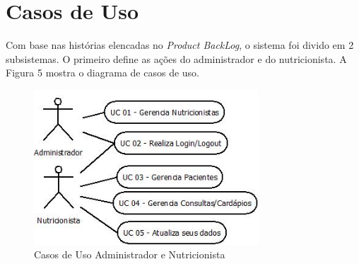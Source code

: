 \documentclass[
	12pt,				%
    oneside,			%
	a4paper,			%
	english,			%
	french,				%
	spanish,			%
	brazil,				%
	]{abntex2}
\begin{document}
\section{Casos de Uso}

Com base nas histórias elencadas no \textit{Product BackLog}, o sistema foi divido em 2
subsistemas. O primeiro define as ações do administrador e do nutricionista. A Figura 5
mostra o diagrama de casos de uso.

\begin{figure} [hbt] 
\label{table1} 
\caption{Casos de Uso Administrador e Nutricionista}
\begin{center}
\includegraphics[width=0.75\textwidth]{uc1.jpeg}
\end{center}
\end{figure}
\end{document}
